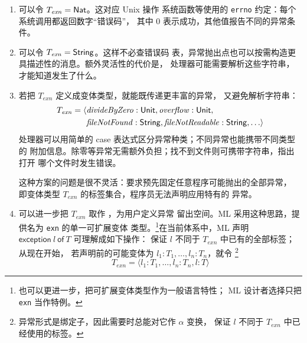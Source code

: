 \begin{enumerate}
  \item 可以令 \(T_{\mathit{exn}}=\mathsf{Nat}\)。这对应 Unix 操作
    系统函数等使用的 \texttt{errno} 约定：每个系统调用都返回数字“错误码”，
    其中 \(0\) 表示成功，其他值报告不同的异常条件。

  \item 可以令 \(T_{\mathit{exn}}=\mathsf{String}\)。这样不必查错误码
    表，异常抛出点也可以按需构造更具描述性的消息。额外灵活性的代价是，
    处理器可能需要解析这些字符串，才能知道发生了什么。

  \item 若把 \(T_{\mathit{exn}}\) 定义成变体类型，就能既传递更丰富的异常，
    又避免解析字符串：
    \[
    \begin{aligned}
    T_{\mathit{exn}}=\langle&
      \mathit{divideByZero}:\mathsf{Unit},
      \mathit{overflow}:\mathsf{Unit},\\
      &\mathit{fileNotFound}:\mathsf{String},
      \mathit{fileNotReadable}:\mathsf{String},\ldots\rangle
    \end{aligned}
    \]
    处理器可以用简单的 case 表达式区分异常种类；不同异常也能携带不同类型的
    附加信息。除零等异常无需额外负担；找不到文件则可携带字符串，指出打开
    哪个文件时发生错误。

    这种方案的问题是很不灵活：要求预先固定任意程序可能抛出的全部异常，
    即变体类型 \(T_{\mathit{exn}}\) 的标签集合，程序员无法声明应用特有的
    异常。

  \item 可以进一步把 \(T_{\mathit{exn}}\) 取作
    ，为用户定义异常
    留出空间。ML 采用这种思路，提供名为 \texttt{exn} 的单一可扩展变体
    类型。\footnote{也可以更进一步，把可扩展变体类型作为一般语言特性；
    ML 设计者选择只把 \texttt{exn} 当作特例。}在当前体系中，ML 声明
    \(\mathsf{exception}\ l\ \mathsf{of}\ T\) 可理解成如下操作：
    保证 \(l\) 不同于 \(T_{\mathit{exn}}\) 中已有的全部标签；从现在开始，
    若声明前的可能变体为 \(l_1:T_1,\ldots,l_n:T_n\)，就令%
    \footnote{异常形式是绑定子，因此需要时总能对它作 \(\alpha\) 变换，
    保证 \(l\) 不同于 \(T_{\mathit{exn}}\) 中已经使用的标签。}
    \[
      T_{\mathit{exn}}=
      \langle l_1:T_1,\ldots,l_n:T_n,l:T\rangle
    \]


\end{enumerate}
